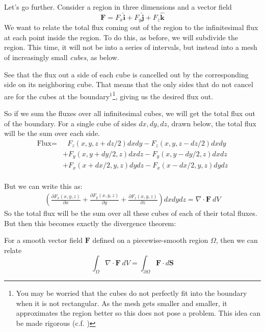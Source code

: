 \documentclass[../master.tex]{subfiles}
\begin{document}
	Let's go further. Consider a region in three dimensions and a vector field 
	\begin{equation*}
		\mathbf F = F_x \hat{\mathbf{i}} + F_y \hat{\mathbf j} + F_z \hat{\mathbf k}
	\end{equation*} 
	We want to relate the total flux coming out of the region to the infinitesimal flux at each point inside the region. To do this, as before, we will subdivide the region. This time, it will not be into a series of intervals, but instead into a mesh of increasingly small \emph{cubes}, as below.
	
	
	See that the flux out a side of each cube is cancelled out by the corresponding side on its neighboring cube. That means that the only sides that do not cancel are for the cubes at the boundary$^1$\footnote{You may be worried that the cubes do not perfectly fit into the boundary when it is not rectangular. As the mesh gets smaller and smaller, it approximates the region better so this does not pose a problem. This idea can be made rigorous (c.f. )}, giving us the desired flux out.
	
	So if we sum the fluxes over all infinitesimal cubes, we will get the total flux out of the boundary. For a single cube of sides $dx,dy,dz$, drawn below, the total flux will be the sum over each side. 
	\begin{align*}
		\text{Flux} =&~~~  F_z(x,y,z+dz/2) dx dy -  F_z(x,y,z-dz/2) dx dy \\ 
						   & + F_y (x,y+dy/2,z) dx dz - F_y (x,y-dy/2,z) dx dz \\ 
						   & + F_x (x+dx/2,y,z) dy dz - F_x (x-dx/2,y,z) dy dz \\ 
	\end{align*}
	
	But we can write this as: 
	\begin{align*}
		\left( \frac{\partial F_x (x,y,z)}{\partial x} + \frac{\partial F_y (x,y,z)}{\partial y} + \frac{\partial F_z(x,y,z)}{\partial z} \right) dx dy dz = \nabla \cdot \mathbf F ~ dV
	\end{align*}
	So the total flux will be the sum over all these cubes of each of their total fluxes. But then this becomes exactly the divergence theorem:
	\begin{theorem}
	For a smooth vector field $\mathbf F$ defined on a piecewise-smooth region $\Omega$, then we can relate
		\begin{equation*}
			\int_\Omega \nabla \cdot \mathbf F ~ dV = \int_{\partial \Omega} \mathbf{F} \cdot d \mathbf S
		\end{equation*}
	\end{theorem}
	
\end{document}
